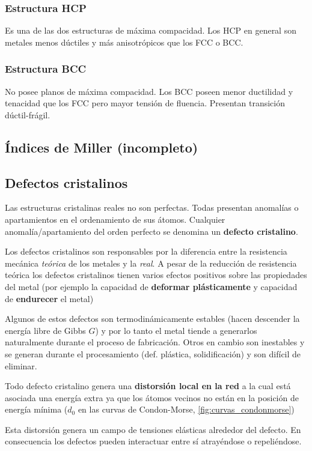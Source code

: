 \subsubsection{Estructura HCP}
Es una de las dos estructuras de máxima compacidad. Los HCP en general son metales menos dúctiles y más anisotrópicos que los FCC o BCC.


\subsubsection{Estructura BCC}
No posee planos de máxima compacidad. Los BCC poseen menor ductilidad y tenacidad que los FCC pero mayor tensión de fluencia. Presentan transición dúctil-frágil.

\subsection{Índices de Miller (incompleto)}

\subsection{Defectos cristalinos}

Las estructuras cristalinas reales no son perfectas. Todas presentan anomalías o apartamientos en el ordenamiento de sus átomos. Cualquier anomalía/apartamiento del orden perfecto se denomina un \textbf{defecto cristalino}.

Los defectos cristalinos son responsables por la diferencia entre la resistencia mecánica \textit{teórica} de los metales y la \textit{real}. A pesar de la reducción de resistencia teórica los defectos cristalinos tienen varios efectos positivos sobre las propiedades del metal (por ejemplo la capacidad de \textbf{deformar plásticamente} y capacidad de \textbf{endurecer} el metal)

Algunos de estos defectos son termodinámicamente estables (hacen descender la energía libre de Gibbs $G$) y por lo tanto el metal tiende a generarlos naturalmente durante el proceso de fabricación. Otros en cambio son inestables y se generan durante el procesamiento (def. plástica, solidificación) y son difícil de eliminar.

Todo defecto cristalino genera una \textbf{distorsión local en la red} a la cual está asociada una energía extra ya que los átomos vecinos no están en la posición de energía mínima ($d_0$ en las curvas de Condon-Morse, \ref{fig:curvas_condonmorse})

Esta distorsión genera un campo de tensiones elásticas alrededor del defecto. En consecuencia los defectos pueden interactuar entre sí atrayéndose o repeliéndose. 

